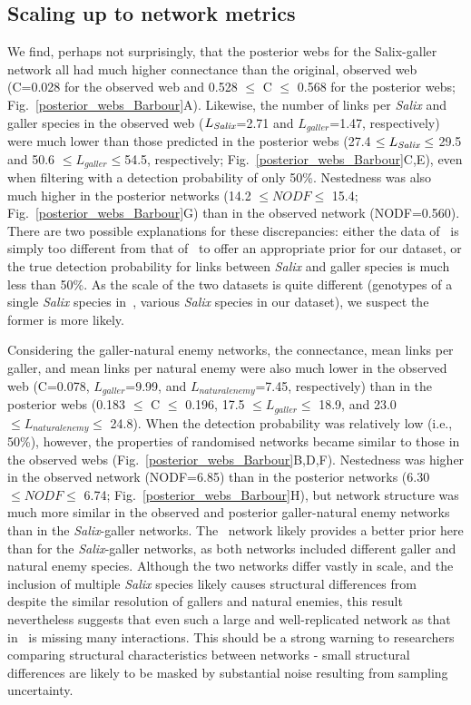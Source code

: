\documentclass[12pt]{article}
\begin{document}
    \subsection*{Scaling up to network metrics}


      We find, perhaps not surprisingly, that the posterior webs for the Salix-galler network all had much higher connectance than the original, observed web (C=0.028 for the observed web and 0.528 $\leq$ C $\leq$ 0.568 for the posterior webs; Fig.~\ref{posterior_webs_Barbour}A). Likewise, the number of links per \emph{Salix} and galler species in the observed web ($L_{\emph{Salix}}$=2.71 and $L_{galler}$=1.47, respectively) were much lower than those predicted in the posterior webs (27.4 $\leq L_{\emph{Salix}} \leq$ 29.5 and 50.6 $\leq L_{galler} \leq $54.5, respectively; Fig.~\ref{posterior_webs_Barbour}C,E), even when filtering with a detection probability of only 50\%. Nestedness was also much higher in the posterior networks (14.2 $\leq NODF \leq$ 15.4; Fig.~\ref{posterior_webs_Barbour}G) than in the observed network (NODF=0.560). There are two possible explanations for these discrepancies: either the data of~\citet{Barbour2016} is simply too different from that of~\citet{Kopelke2017} to offer an appropriate prior for our dataset, or the true detection probability for links between \emph{Salix} and galler species is much less than 50\%. As the scale of the two datasets is quite different (genotypes of a single \emph{Salix} species in~\citet{Barbour2016}, various \emph{Salix} species in our dataset), we suspect the former is more likely.


      Considering the galler-natural enemy networks, the connectance, mean links per galler, and mean links per natural enemy were also much lower in the observed web (C=0.078, $L_{galler}$=9.99, and $L_{natural enemy}$=7.45, respectively) than in the posterior webs (0.183 $\leq$ C $\leq$ 0.196, 17.5 $\leq L_{galler} \leq$ 18.9, and 23.0 $\leq L_{natural enemy} \leq$ 24.8). When the detection probability was relatively low (i.e., 50\%), however, the properties of randomised networks became similar to those in the observed webs (Fig.~\ref{posterior_webs_Barbour}B,D,F). Nestedness was higher in the observed network (NODF=6.85) than in the posterior networks (6.30 $\leq NODF \leq$ 6.74; Fig.~\ref{posterior_webs_Barbour}H), but network structure was much more similar in the observed and posterior galler-natural enemy networks than in the \emph{Salix}-galler networks. The~\citet{Barbour2016} network likely provides a better prior here than for the \emph{Salix}-galler networks, as both networks included different galler and natural enemy species. Although the two networks differ vastly in scale, and the inclusion of multiple \emph{Salix} species likely causes structural differences from~\citet{Barbour2016} despite the similar resolution of gallers and natural enemies, this result nevertheless suggests that even such a large and well-replicated network as that in~\citet{Kopelke2017} is missing many interactions. This should be a strong warning to researchers comparing structural characteristics between networks - small structural differences are likely to be masked by substantial noise resulting from sampling uncertainty.
\end{document}
